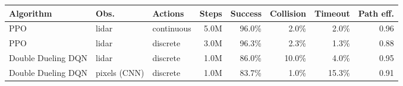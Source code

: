 \begin{tabular}{lllrrrrr}
\toprule
Algorithm & Obs. & Actions & Steps & Success & Collision & Timeout & Path eff. \\
\midrule
PPO & lidar & continuous & 5.0M & 96.0\% & 2.0\% & 2.0\% & 0.96 \\
PPO & lidar & discrete & 3.0M & 96.3\% & 2.3\% & 1.3\% & 0.88 \\
Double Dueling DQN & lidar & discrete & 1.0M & 86.0\% & 10.0\% & 4.0\% & 0.95 \\
Double Dueling DQN & pixels (CNN) & discrete & 1.0M & 83.7\% & 1.0\% & 15.3\% & 0.91 \\
\bottomrule
\end{tabular}
